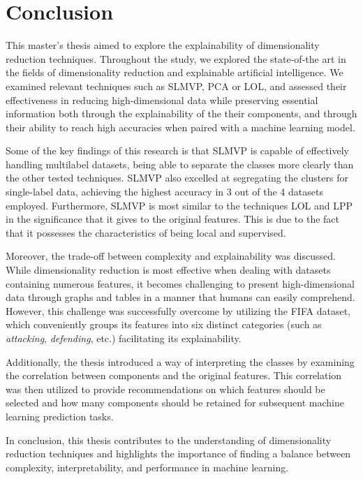 \chapter{Conclusion}


This master's thesis aimed to explore the explainability of dimensionality reduction techniques. Throughout the study, we explored the state-of-the art in the fields of dimensionality reduction and explainable artificial intelligence. We examined relevant techniques such as SLMVP, PCA or LOL, and assessed their effectiveness in reducing high-dimensional data while preserving essential information both through the explainability of the their components, and through their ability to reach high accuracies when paired with a machine learning model.

Some of the key findings of this research is that SLMVP is capable of effectively handling multilabel datasets, being able to separate the classes more clearly than the other tested techniques. SLMVP also excelled at segregating the clusters for single-label data, achieving the highest accuracy in 3 out of the 4 datasets employed. Furthermore, SLMVP is most similar to the techniques LOL and LPP in the significance that it gives to the original features. This is due to the fact that it possesses the characteristics of being local and supervised.

Moreover, the trade-off between complexity and explainability was discussed. While dimensionality reduction is most effective when dealing with datasets containing numerous features, it becomes challenging to present high-dimensional data through graphs and tables in a manner that humans can easily comprehend. However, this challenge was successfully overcome by utilizing the FIFA dataset, which conveniently groups its features into six distinct categories (such as \textit{attacking}, \textit{defending}, etc.) facilitating its explainability.

Additionally, the thesis introduced a way of interpreting the classes by examining the correlation between components and the original features. This correlation was then utilized to provide recommendations on which features should be selected and how many components should be retained for subsequent machine learning prediction tasks.

In conclusion, this thesis contributes to the understanding of dimensionality reduction techniques and highlights the importance of finding a balance between complexity, interpretability, and performance in machine learning.

